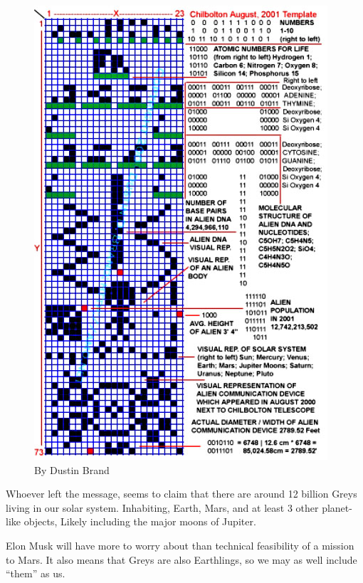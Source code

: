 \documentclass{report}
\begin{document}
\begin{figure}
  \includegraphics[width=\textwidth]{photograph/chibolton-analysis.jpg}
\caption{By Dustin Brand\cite{contact}}
\label{chi:analysis}
\end{figure}

Whoever left the message, seems to claim that there are around 12 billion
Greys living in our solar system. Inhabiting, Earth, Mars, and at least 3 other
planet-like objects, Likely including the major moons of Jupiter. 

Elon Musk will have more to worry about than technical feasibility of a mission
to Mars. It also means that Greys are also Earthlings, so we may as well include
``them'' as us. 
\end{document}
